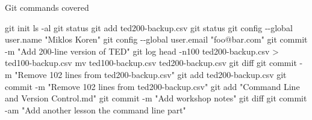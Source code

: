\documentclass[
  ignorenonframetext,
  aspectratio=54,
]{beamer}
\newenvironment{Shaded}{}{}
\newcommand{\AttributeTok}[1]{\textcolor[rgb]{0.49,0.56,0.16}{#1}}
\newcommand{\FunctionTok}[1]{\textcolor[rgb]{0.02,0.16,0.49}{#1}}
\newcommand{\NormalTok}[1]{#1}
\newcommand{\OperatorTok}[1]{\textcolor[rgb]{0.40,0.40,0.40}{#1}}
\newcommand{\StringTok}[1]{\textcolor[rgb]{0.25,0.44,0.63}{#1}}
\begin{document}
\begin{frame}[fragile]{Git commands covered}
\protect\hypertarget{git-commands-covered}{}
\begin{Shaded}
\begin{Highlighting}[]
\FunctionTok{git}\NormalTok{ init}
\FunctionTok{ls} \AttributeTok{{-}al}
\FunctionTok{git}\NormalTok{ status}
\FunctionTok{git}\NormalTok{ add ted200{-}backup.csv }
\FunctionTok{git}\NormalTok{ status}
\FunctionTok{git}\NormalTok{ config }\AttributeTok{{-}{-}global}\NormalTok{ user.name }\StringTok{"Miklos Koren"}
\FunctionTok{git}\NormalTok{ config }\AttributeTok{{-}{-}global}\NormalTok{ user.email }\StringTok{"foo@bar.com"}
\FunctionTok{git}\NormalTok{ commit }\AttributeTok{{-}m} \StringTok{"Add 200{-}line version of TED"}
\FunctionTok{git}\NormalTok{ log}
\FunctionTok{head} \AttributeTok{{-}n100}\NormalTok{ ted200{-}backup.csv }\OperatorTok{\textgreater{}}\NormalTok{ ted100{-}backup.csv}
\FunctionTok{mv}\NormalTok{ ted100{-}backup.csv ted200{-}backup.csv }
\FunctionTok{git}\NormalTok{ diff}
\FunctionTok{git}\NormalTok{ commit }\AttributeTok{{-}m} \StringTok{"Remove 102 lines from ted200{-}backup.csv"}
\FunctionTok{git}\NormalTok{ add ted200{-}backup.csv }
\FunctionTok{git}\NormalTok{ commit }\AttributeTok{{-}m} \StringTok{"Remove 102 lines from ted200{-}backup.csv"}
\FunctionTok{git}\NormalTok{ add }\StringTok{"Command Line and Version Control.md"} 
\FunctionTok{git}\NormalTok{ commit }\AttributeTok{{-}m} \StringTok{"Add workshop notes"}
\FunctionTok{git}\NormalTok{ diff}
\FunctionTok{git}\NormalTok{ commit }\AttributeTok{{-}am} \StringTok{"Add another lesson the command line part"}
\end{Highlighting}
\end{Shaded}
\end{frame}
\end{document}
